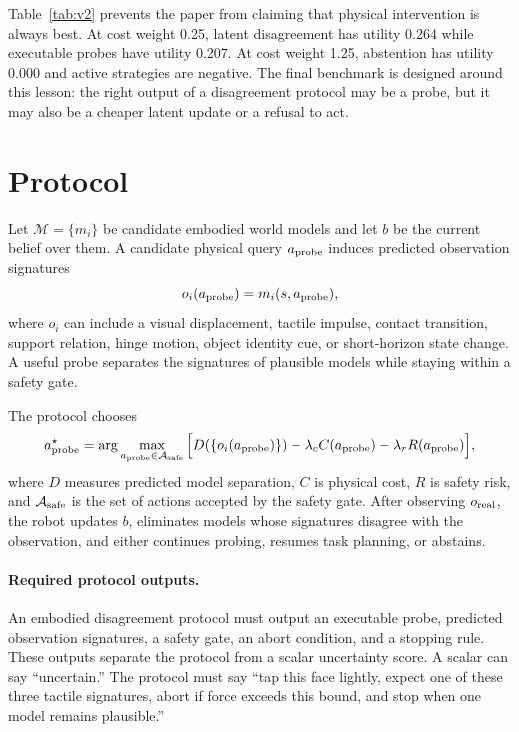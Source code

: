 \documentclass{article}
\newcommand{\modelset}{\mathcal{M}}
\newcommand{\safe}{\mathcal{A}_{\rm safe}}
\newcommand{\probe}{a_{\rm probe}}
\begin{document}
\begin{table}[t]
\centering
\small

\caption{V2 probe-cost stress. Executable probes win only while physical probe cost is cheap. At moderate cost, latent disagreement wins; at very high cost, abstention wins.}
\label{tab:v2}
\end{table}

Table~\ref{tab:v2} prevents the paper from claiming that physical intervention is always best. At cost weight 0.25, latent disagreement has utility 0.264 while executable probes have utility 0.207. At cost weight 1.25, abstention has utility 0.000 and active strategies are negative. The final benchmark is designed around this lesson: the right output of a disagreement protocol may be a probe, but it may also be a cheaper latent update or a refusal to act.

\section{Protocol}

Let $\modelset=\{m_i\}$ be candidate embodied world models and let $b$ be the current belief over them. A candidate physical query $\probe$ induces predicted observation signatures
\[
    o_i(\probe) = m_i(s,\probe),
\]
where $o_i$ can include a visual displacement, tactile impulse, contact transition, support relation, hinge motion, object identity cue, or short-horizon state change. A useful probe separates the signatures of plausible models while staying within a safety gate.

The protocol chooses
\[
\probe^\star = \arg\max_{\probe \in \safe}
\Big[D(\{o_i(\probe)\}) - \lambda_c C(\probe) - \lambda_r R(\probe)\Big],
\]
where $D$ measures predicted model separation, $C$ is physical cost, $R$ is safety risk, and $\safe$ is the set of actions accepted by the safety gate. After observing $o_{\rm real}$, the robot updates $b$, eliminates models whose signatures disagree with the observation, and either continues probing, resumes task planning, or abstains.

\paragraph{Required protocol outputs.}
An embodied disagreement protocol must output an executable probe, predicted observation signatures, a safety gate, an abort condition, and a stopping rule. These outputs separate the protocol from a scalar uncertainty score. A scalar can say ``uncertain.'' The protocol must say ``tap this face lightly, expect one of these three tactile signatures, abort if force exceeds this bound, and stop when one model remains plausible.''
\end{document}

